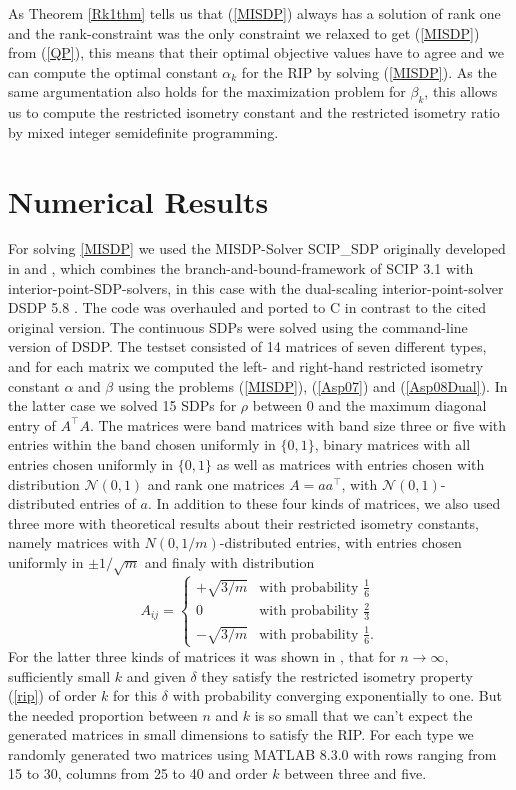 \documentclass[a4paper,11pt,1p]{elsarticle}
\newcommand{\T}{^{\top}}
\begin{document}
As Theorem \ref{Rk1thm} tells us that (\ref{MISDP}) always has a solution of rank one and the rank-constraint was the only constraint we relaxed to get (\ref{MISDP}) from (\ref{QP}), this means that their optimal objective values 
have to agree and we can compute the optimal constant $\alpha_k$ for the RIP by solving (\ref{MISDP}). As the same argumentation also holds for the maximization problem for $\beta_k$, this allows us to compute the restricted isometry
constant and the restricted isometry ratio by mixed integer semidefinite programming.

\section{Numerical Results}

For solving \ref{MISDP} we used the MISDP-Solver SCIP\_SDP originally developed in \cite{MS12} and \cite{Mar13}, which combines the branch-and-bound-framework of SCIP 3.1 \cite{SCIP} with interior-point-SDP-solvers, in this case 
with the dual-scaling interior-point-solver DSDP 5.8 \cite{DSDP}. The code was overhauled and ported to C in contrast to the cited original version. The continuous SDPs were solved using the command-line version of DSDP. The testset
consisted of 14 matrices of seven different types, and for each matrix we computed
the left- and right-hand restricted isometry constant $\alpha$ and $\beta$ using the problems (\ref{MISDP}), (\ref{Asp07}) and (\ref{Asp08Dual}). In the latter case we solved 15 SDPs for $\rho$ between $0$ and the maximum diagonal 
entry of $A\T A$. The matrices were band matrices with band size three or five with entries within the band chosen uniformly in $\{0,1\}$, binary matrices with all entries chosen uniformly in $\{0,1\}$ as well as matrices with 
entries chosen with distribution $\mathcal{N}(0,1)$ and rank one matrices $A = aa\T$, with $\mathcal{N}(0,1)$-distributed entries of $a$. In addition to these four kinds of matrices, we also used three more with theoretical results
about their restricted isometry constants, namely matrices with $N(0, 1/m)$-distributed entries, with entries chosen uniformly in $\pm 1/\sqrt{m}$ and finaly with distribution
\begin{equation}\nonumber
A_{ij} = \begin{cases} + \sqrt{3/m} & \text{with probability } \frac{1}{6} \\ 0 & \text{with probability } \frac{2}{3} \\ - \sqrt{3/m} & \text{with probability } \frac{1}{6}. \end{cases}
\end{equation}
For the latter three kinds of matrices it was shown in \cite{BDDW08}, that for $n \rightarrow \infty$, sufficiently small $k$ and given $\delta$ they satisfy the restricted isometry property (\ref{rip}) of order $k$ for this $\delta$
with probability converging exponentially to one. But the needed proportion between $n$ and $k$ is so small that we can't expect the generated matrices in small dimensions to satisfy the RIP. For each type we randomly generated two
matrices using MATLAB 8.3.0 \cite{MAT} with rows ranging from 15 to 30, columns from 25 to 40 and order $k$ between three and five.
\end{document}
